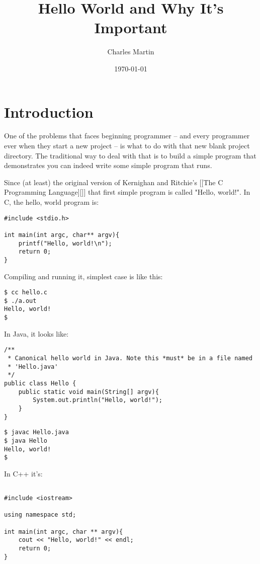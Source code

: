 \documentclass[11pt]{article}
\author{Charles Martin}
\date{\today}
\title{Hello World and Why It's Important}
\begin{document}
\maketitle
\tableofcontents


\section{Introduction}
\label{sec:orgb9f4cbf}

One of the problems that faces beginning programmer -- and every
programmer ever when they start a new project -- is what to do with
that new blank project directory.  The traditional way to deal with that is to build a
simple program that demonstrates you can indeed write some simple
program that runs.

Since (at least) the original version of Kernighan and Ritchie's [[The
C Programming Language][]] that first simple program is called "Hello,
world!". In C, the hello, world program is:

\begin{verbatim}
#include <stdio.h>

int main(int argc, char** argv){
    printf("Hello, world!\n");
    return 0;
}
\end{verbatim}

Compiling and running it, simplest case is like this:

\begin{verbatim}
$ cc hello.c
$ ./a.out
Hello, world!
$
\end{verbatim}

In Java, it looks like:
\begin{verbatim}
/**
 * Canonical hello world in Java. Note this *must* be in a file named
 * 'Hello.java'
 */
public class Hello {
    public static void main(String[] argv){
        System.out.println("Hello, world!");
    }
}

\end{verbatim}
\begin{verbatim}
$ javac Hello.java
$ java Hello
Hello, world!
$
\end{verbatim}

In C++ it's:
\begin{verbatim}

#include <iostream>

using namespace std;

int main(int argc, char ** argv){
    cout << "Hello, world!" << endl;
    return 0;
}

\end{verbatim}
\end{document}
